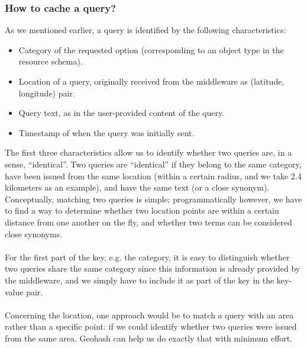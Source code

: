 \subsubsection{How to cache a query?}
As we mentioned earlier, a query is identified by the following characteristics:
\begin{itemize}
  \item Category of the requested option (corresponding to an object type in the resource schema).
  \item Location of a query, originally received from the middleware as (latitude, longitude) pair.
  \item Query text, as in the user-provided content of the query.
  \item Timestamp of when the query was initially sent.
\end{itemize}
The first three characteristics allow us to identify whether two queries are, in a sense, ``identical''. Two queries are ``identical'' if they belong to the same category, have been issued from the same location (within a certain radius, and we take 2.4 kilometers as an example), and have the same text (or a close synonym). Conceptually, matching two queries is simple; programmatically however, we have to find a way to determine whether two location points are within a certain distance from one another on the fly, and whether two terms can be considered close synonyms.\\\\
For the first part of the key, e.g. the category, it is easy to distinguish whether two queries share the same category since this information is already provided by the middleware, and we simply have to include it as part of the key in the key-value pair.\\\\
Concerning the location, one approach would be to match a query with an area rather than a specific point: if we could identify whether two queries were issued from the same area. Geohash can help us do exactly that with minimum effort.
